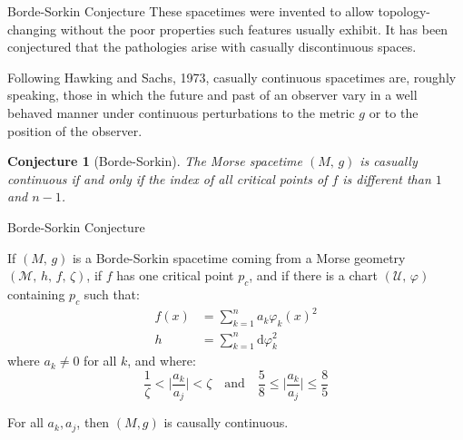 \documentclass{beamer}
\newtheorem{conjecture}{Conjecture}
\begin{document}
    \begin{frame}{Borde-Sorkin Conjecture}
        These spacetimes were invented to allow topology-changing
        without the poor properties such features usually exhibit. It has been
        conjectured that the pathologies arise with casually discontinuous
        spaces.
        \par\hfill\par
        Following Hawking and Sachs, 1973, casually continuous spacetimes are,
        roughly speaking, those in which the future and past of an observer
        vary in a well behaved manner under continuous perturbations to the
        metric $g$ or to the position of the observer.
        \par\hfill\par
        \begin{conjecture}[Borde-Sorkin]
            The Morse spacetime $(M,\,g)$ is casually continuous if and only
            if the index of all critical points of $f$ is different than
            $1$ and $n-1$.
        \end{conjecture}
    \end{frame}
    \begin{frame}{Borde-Sorkin Conjecture}
        \begin{theorem}
            If $(M,\,g)$ is a Borde-Sorkin spacetime coming from a Morse
            geometry $(\mathcal{M},\,h,\,f,\,\zeta)$, if $f$ has one critical
            point $p_{c}$, and if there is a chart $(\mathcal{U},\,\varphi)$
            containing $p_{c}$ such that:
            \begin{align}
                f(x)&=\sum_{k=1}^{n}a_{k}\varphi_{k}(x)^{2}\\
                h&=\sum_{k=1}^{n}\textrm{d}\varphi_{k}^{2}
            \end{align}
            where $a_{k}\ne{0}$ for all $k$, and where:
            \begin{equation}
                \frac{1}{\zeta}<\Big|\frac{a_{k}}{a_{j}}\Big|<\zeta
                \quad\textrm{and}\quad
                \frac{5}{8}\leq\Big|\frac{a_{k}}{a_{j}}\Big|\leq\frac{8}{5}
            \end{equation}
        \end{theorem}
        For all $a_{k},a_{j}$, then $(M,g)$ is causally continuous.
    \end{frame}
\end{document}
